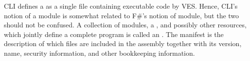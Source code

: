 \documentclass[fsharpnotes.tex]{subfiles}
\begin{document}
CLI defines a  as a single file containing executable code by VES. Hence, CLI's notion of a module is somewhat related to F\#'s notion of module, but the two should not be confused. A collection of modules, a , and possibly other resources, which jointly define a complete program is called an . The manifest is the description of which files are included in the assembly together with its version, name, security information, and other bookkeeping information.
\end{document}

